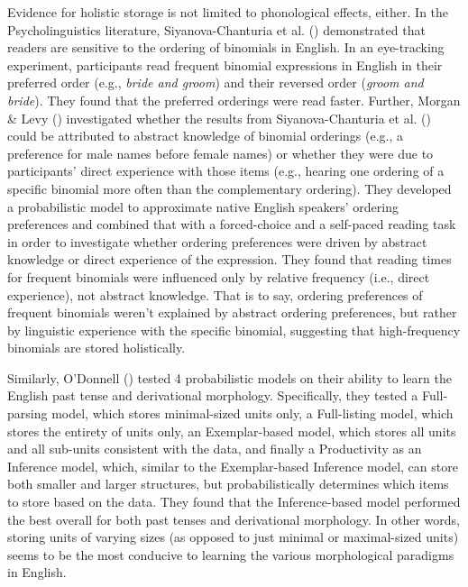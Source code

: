 \documentclass[
  12pt,
  letterpaper,
]{scrreprt}
\begin{document}
Evidence for holistic storage is not limited to phonological effects,
either. In the Psycholinguistics literature, Siyanova-Chanturia et al.
()
demonstrated that readers are sensitive to the ordering of binomials in
English. In an eye-tracking experiment, participants read frequent
binomial expressions in English in their preferred order (e.g.,
\emph{bride and groom}) and their reversed order (\emph{groom and
bride}). They found that the preferred orderings were read faster.
Further, Morgan \& Levy
() investigated
whether the results from Siyanova-Chanturia et al.
() could be
attributed to abstract knowledge of binomial orderings (e.g., a
preference for male names before female names) or whether they were due
to participants' direct experience with those items (e.g., hearing one
ordering of a specific binomial more often than the complementary
ordering). They developed a probabilistic model to approximate native
English speakers' ordering preferences and combined that with a
forced-choice and a self-paced reading task in order to investigate
whether ordering preferences were driven by abstract knowledge or direct
experience of the expression. They found that reading times for frequent
binomials were influenced only by relative frequency (i.e., direct
experience), not abstract knowledge. That is to say, ordering
preferences of frequent binomials weren't explained by abstract ordering
preferences, but rather by linguistic experience with the specific
binomial, suggesting that high-frequency binomials are stored
holistically.

Similarly, O'Donnell
() tested 4
probabilistic models on their ability to learn the English past tense
and derivational morphology. Specifically, they tested a Full-parsing
model, which stores minimal-sized units only, a Full-listing model,
which stores the entirety of units only, an Exemplar-based model, which
stores all units and all sub-units consistent with the data, and finally
a Productivity as an Inference model, which, similar to the
Exemplar-based Inference model, can store both smaller and larger
structures, but probabilistically determines which items to store based
on the data. They found that the Inference-based model performed the
best overall for both past tenses and derivational morphology. In other
words, storing units of varying sizes (as opposed to just minimal or
maximal-sized units) seems to be the most conducive to learning the
various morphological paradigms in English.
\end{document}
